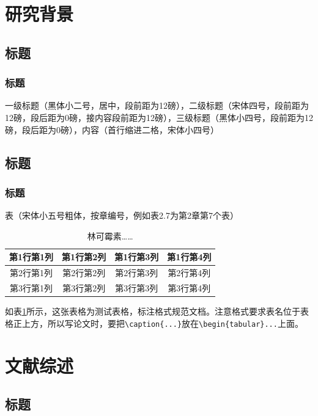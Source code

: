 \documentclass[opening]{ecustbachelorthesis}
\begin{document}
\docinit
\makethesistitle\makemyinfo
\begin{abstract}
\makeatletter\me@abstractzh\makeatother
\end{abstract}

\section{研究背景}
\subsection{标题}
\subsubsection{标题}
一级标题（黑体小二号，居中，段前距为12磅），二级标题（宋体四号，段前距为12磅，段后距为0磅，接内容段前距为12磅），三级标题（黑体小四号，段前距为12磅，段后距为0磅），内容（首行缩进二格，宋体小四号）
\subsection{标题}
\subsubsection{标题}
表（宋体小五号粗体，按章编号，例如表2.7为第2章第7个表）
\begin{table}[!htbp]
  \centering
  \caption{林可霉素……}
  \label{tab:linc}
  \begin{tabular}{|c|c|c|c|}\hline
    第1行第1列 & 第1行第2列 & 第1行第3列 & 第1行第4列\\ \hline
    第2行第1列 & 第2行第2列 & 第2行第3列 & 第2行第4列\\ \hline
    第3行第1列 & 第3行第2列 & 第3行第3列 & 第3行第4列\\ \hline
  \end{tabular}
\end{table}

如表\ref{tab:linc}所示，这张表格为测试表格，标注格式规范文档。注意格式要求表名位于表格正上方，所以写论文时，要把\verb$\caption{...}$放在\verb$\begin{tabular}...$上面。

\section{文献综述}
\subsection{标题}
\end{document}
